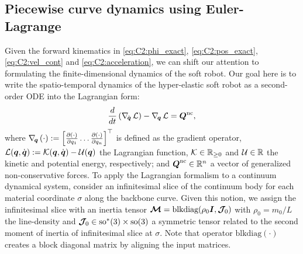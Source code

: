 \subsection{Piecewise curve dynamics using Euler-Lagrange}
\noindent Given the forward kinematics in \eqref{eq:C2:phi_exact}, \eqref{eq:C2:pos_exact}, \eqref{eq:C2:vel_cont} and \eqref{eq:C2:acceleration}, we can shift our attention to formulating the finite-dimensional dynamics of the soft robot. Our goal here is to write the spatio-temporal dynamics of the hyper-elastic soft robot as a second-order ODE into the Lagrangian form:
%
%
\begin{equation}
\frac{d}{d t}\left(\nabla_{\!{\dot{\boldsymbol{q}}}}\, \mathcal{L} \right) - \nabla_{\!{\boldsymbol{q}}}\, \mathcal{L} = \boldsymbol{Q}^{\textnormal{nc}}, \label{eq:C2:euler_largrange}
\end{equation}
%
\noindent where $\nabla_{\!\boldsymbol{q}}\, (\cdot):= \left[\frac{\partial (\cdot)}{\partial q_1} \hdots \frac{\partial (\cdot)}{\partial q_n} \right]^\top$ is defined as the gradient operator, $\mathcal{L}({\boldsymbol{q}},{\dot{\boldsymbol{q}}}) := \mathcal{K}({\boldsymbol{q}},{\dot{\boldsymbol{q}}}) - \mathcal{U}({\boldsymbol{q}})$ the Lagrangian function, $\mathcal{K} \in \mathbb{R}_{\ge0}$ and $\mathcal{U}\in \mathbb{R}$ the kinetic and potential energy, respectively; and $\boldsymbol{Q}^{\textnormal{nc}} \in \mathbb{R}^n$ a vector of generalized non-conservative forces. To apply the Lagrangian formalism to a continuum dynamical system,  consider an infinitesimal slice of the continuum body for each material coordinate $\sigma$ along the backbone curve. Given this notion, we assign the infinitesimal slice with an inertia tensor $\boldsymbol{\mathcal{M}} = \text{blkdiag}(\rho_0 \boldsymbol{I},\boldsymbol{\mathcal{J}}_{\!0})$ with $\rho_0 = m_0/L$ the line-density and $\boldsymbol{\mathcal{J}}_{\!0} \in \textup{\textrm{so}}^*(3) \times \textup{\textrm{so}}(3)$ a symmetric tensor related to the second moment of inertia of infinitesimal slice at $\sigma$.  Note that operator $\text{blkdiag}(\cdot)$ creates a block diagonal matrix by aligning the input matrices.

